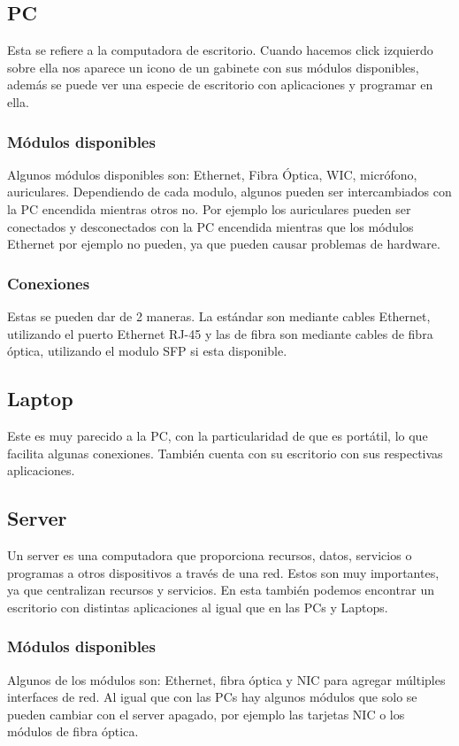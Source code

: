 \documentclass{article}
\begin{document}
\subsection{PC}
Esta se refiere a la computadora de escritorio. Cuando hacemos click izquierdo sobre ella nos aparece un icono de un gabinete con sus módulos disponibles, además se puede ver una especie de escritorio con aplicaciones y programar en ella.

\subsubsection{Módulos disponibles}
Algunos módulos disponibles son: Ethernet, Fibra Óptica, WIC, micrófono, auriculares. Dependiendo de cada modulo, algunos pueden ser intercambiados con la PC encendida mientras otros no. Por ejemplo los auriculares pueden ser conectados y desconectados con la PC encendida mientras que los módulos Ethernet por ejemplo no pueden, ya que pueden causar problemas de hardware.

\subsubsection{Conexiones}
Estas se pueden dar de 2 maneras. La estándar son mediante cables Ethernet, utilizando el puerto Ethernet RJ-45 y las de fibra son mediante cables de fibra óptica, utilizando el modulo SFP si esta disponible.

\subsection{Laptop}
Este es muy parecido a la PC, con la particularidad de que es portátil, lo que facilita algunas conexiones. También cuenta con su escritorio con sus respectivas aplicaciones.

\subsection{Server}
Un server es una computadora que proporciona recursos, datos, servicios o programas a otros dispositivos a través de una red. Estos son muy importantes, ya que centralizan recursos y servicios. En esta también podemos encontrar un escritorio con distintas aplicaciones al igual que en las PCs y Laptops.

\subsubsection{Módulos disponibles}
Algunos de los módulos son: Ethernet, fibra óptica y NIC para agregar múltiples interfaces de red. Al igual que con las PCs hay algunos módulos que solo se pueden cambiar con el server apagado, por ejemplo las tarjetas NIC o los módulos de fibra óptica.
\end{document}
